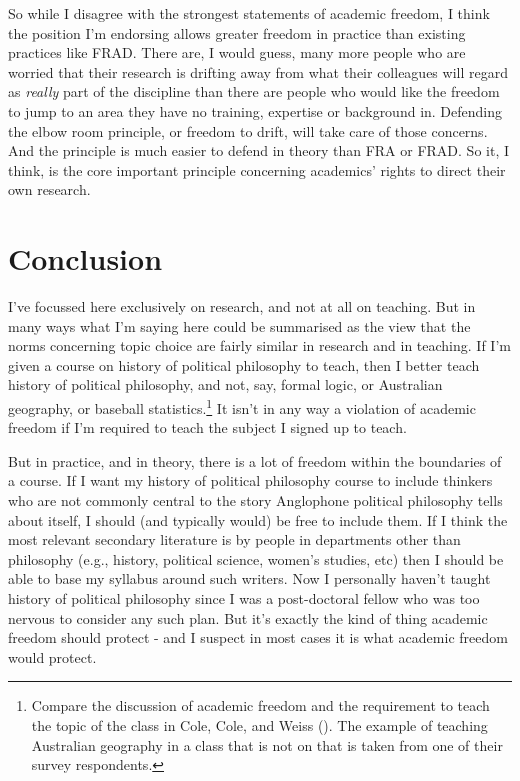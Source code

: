 \documentclass[
  11pt,
  letterpaper,
  DIV=11,
  numbers=noendperiod,
  twoside]{scrartcl}
\begin{document}
So while I disagree with the strongest statements of academic freedom, I
think the position I'm endorsing allows greater freedom in practice than
existing practices like FRAD. There are, I would guess, many more people
who are worried that their research is drifting away from what their
colleagues will regard as \emph{really} part of the discipline than
there are people who would like the freedom to jump to an area they have
no training, expertise or background in. Defending the elbow room
principle, or freedom to drift, will take care of those concerns. And
the principle is much easier to defend in theory than FRA or FRAD. So
it, I think, is the core important principle concerning academics'
rights to direct their own research.

\section*{Conclusion}\label{conclusion}

I've focussed here exclusively on research, and not at all on teaching.
But in many ways what I'm saying here could be summarised as the view
that the norms concerning topic choice are fairly similar in research
and in teaching. If I'm given a course on history of political
philosophy to teach, then I better teach history of political
philosophy, and not, say, formal logic, or Australian geography, or
baseball statistics.\footnote{Compare the discussion of academic freedom
  and the requirement to teach the topic of the class in Cole, Cole, and
  Weiss (). The example of teaching
  Australian geography in a class that is not on that is taken from one
  of their survey respondents.} It isn't in any way a violation of
academic freedom if I'm required to teach the subject I signed up to
teach.

But in practice, and in theory, there is a lot of freedom within the
boundaries of a course. If I want my history of political philosophy
course to include thinkers who are not commonly central to the story
Anglophone political philosophy tells about itself, I should (and
typically would) be free to include them. If I think the most relevant
secondary literature is by people in departments other than philosophy
(e.g., history, political science, women's studies, etc) then I should
be able to base my syllabus around such writers. Now I personally
haven't taught history of political philosophy since I was a
post-doctoral fellow who was too nervous to consider any such plan. But
it's exactly the kind of thing academic freedom should protect - and I
suspect in most cases it is what academic freedom would protect.
\end{document}
